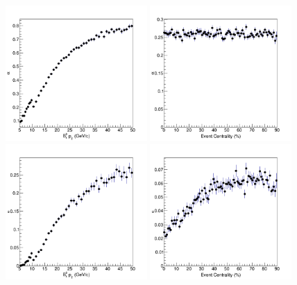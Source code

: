 \begin{figure}[h]
\begin{center}
\includegraphics[width=0.48\textwidth]{Figures/Chapter5/BPAcc1DPtHis.png}
\includegraphics[width=0.48\textwidth]{Figures/Chapter5/BPAcc1DCentHis.png}
\includegraphics[width=0.48\textwidth]{Figures/Chapter5/BPSel1DPtHis.png}
\includegraphics[width=0.48\textwidth]{Figures/Chapter5/BPSel1DCentHis.png}

\end{center}
\end{figure}
